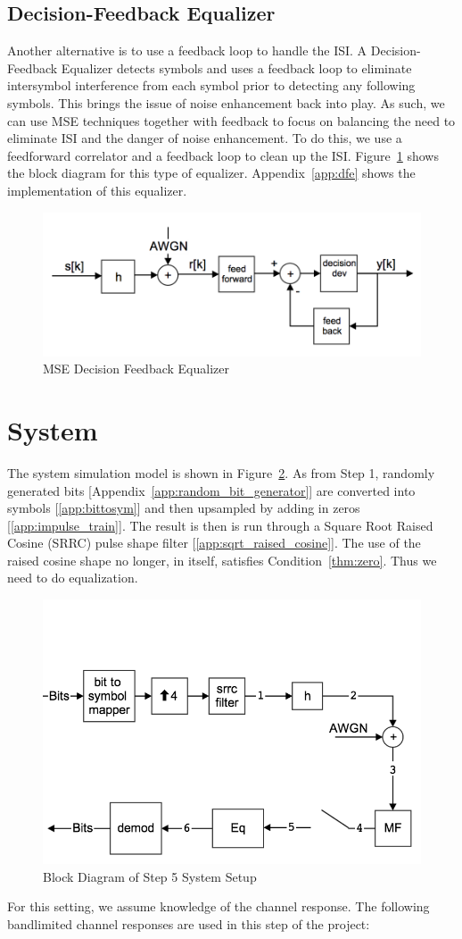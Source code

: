 \documentclass[]{article}
\begin{document}
\subsection{Decision-Feedback Equalizer}
\label{sec:dfe}
Another alternative is to use a feedback loop to handle the ISI.  A Decision-Feedback Equalizer detects symbols and uses a feedback loop to eliminate intersymbol interference from each symbol prior to detecting any following symbols.  This brings the issue of noise enhancement back into play.  As such, we can use MSE techniques together with feedback to focus on balancing the need to eliminate ISI and the danger of noise enhancement.  To do this, we use a feedforward correlator and a feedback loop to clean up the ISI.  Figure~\ref{fig:dfe} shows the block diagram for this type of equalizer.  Appendix~\ref{app:dfe} shows the implementation of this equalizer.

\begin{figure}[H]
\centering
\includegraphics[width=.6\textwidth]{mse_dfe.png}
\caption{MSE Decision Feedback Equalizer\label{fig:dfe}}
\end{figure}

\newpage
\section{System}
\label{sec:system}
The system simulation model is shown in Figure~\ref{fig:step5}.  As from Step 1, randomly generated bits [Appendix~\ref{app:random_bit_generator}] are converted into symbols [\ref{app:bittosym}] and then upsampled by adding in zeros [\ref{app:impulse_train}].  The result is then is run through a Square Root Raised Cosine (SRRC) pulse shape filter [\ref{app:sqrt_raised_cosine}].  The use of the raised cosine shape no longer, in itself, satisfies Condition~\ref{thm:zero}.  Thus we need to do equalization.
\begin{figure}[H]
\centering
\includegraphics[width=.6\textwidth]{step5.png}
\caption{Block Diagram of Step 5 System Setup\label{fig:step5}}
\end{figure}
For this setting, we assume knowledge of the channel response. The following bandlimited channel responses are used in this step of the project:
\end{document}
